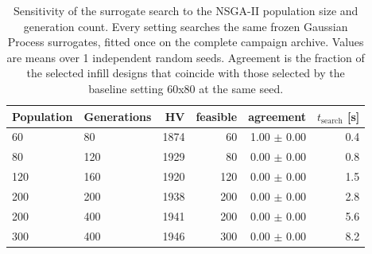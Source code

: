 \begin{table}[htbp]
\centering
\caption{Sensitivity of the surrogate search to the NSGA-II population size and generation count. Every setting searches the same frozen Gaussian Process surrogates, fitted once on the complete campaign archive. Values are means over 1 independent random seeds. Agreement is the fraction of the selected infill designs that coincide with those selected by the baseline setting 60x80 at the same seed.}
\label{tab:nsga_sensitivity}
\begin{tabular}{llrrrr}
\toprule
Population & Generations & HV & feasible & agreement & $t_{\mathrm{search}}$ [s] \\
\midrule
60 & 80 & 1874 & 60 & 1.00 $\pm$ 0.00 & 0.4 \\
80 & 120 & 1929 & 80 & 0.00 $\pm$ 0.00 & 0.8 \\
120 & 160 & 1920 & 120 & 0.00 $\pm$ 0.00 & 1.5 \\
200 & 200 & 1938 & 200 & 0.00 $\pm$ 0.00 & 2.8 \\
200 & 400 & 1941 & 200 & 0.00 $\pm$ 0.00 & 5.6 \\
300 & 400 & 1946 & 300 & 0.00 $\pm$ 0.00 & 8.2 \\
\bottomrule
\end{tabular}
\end{table}
